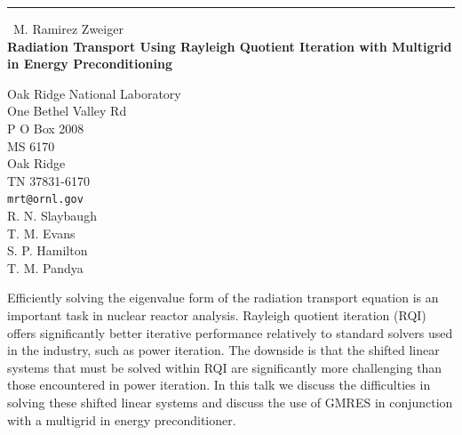 \documentclass{report}
\begin{document}
\begin{center}
\rule{6in}{1pt} \
{\large M. Ramirez Zweiger \\
{\bf Radiation Transport Using Rayleigh Quotient Iteration with Multigrid in Energy Preconditioning}}

Oak Ridge National Laboratory \\ One Bethel Valley Rd \\ P O Box 2008 \\ MS 6170 \\ Oak Ridge \\ TN 37831-6170
\\
{\tt mrt@ornl.gov}\\
R. N.  Slaybaugh\\
T. M. Evans\\
S. P.  Hamilton\\
T. M.  Pandya\end{center}

Efficiently solving the eigenvalue form of the radiation transport
equation is an important task in nuclear reactor analysis. Rayleigh
quotient iteration (RQI) offers significantly better iterative
performance relatively to standard solvers used in the industry, such as
power iteration. The downside is that the shifted linear systems that
must be solved within RQI are significantly more challenging than those
encountered in power iteration. In this talk we discuss the difficulties
in solving these shifted linear systems and discuss the use of GMRES in
conjunction with a multigrid in energy preconditioner.
\end{document}
